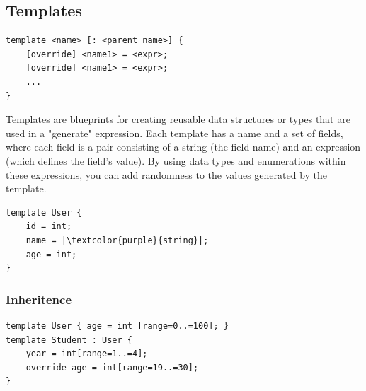 \documentclass[11pt,a4paper]{article}
\begin{document}
    \subsection{Templates}
    \begin{listing}[h]

    \begin{verbatim}
template <name> [: <parent_name>] {
    [override] <name1> = <expr>;
    [override] <name1> = <expr>;
    ...
}
    \end{verbatim}
    \centering
    \caption{Template declaration}
    \label{declaration:template}
    \end{listing}
    \par Templates are blueprints for creating reusable data structures or 
    types that are used in a "generate" expression. Each template has 
    a name and a set of fields, where each field is a pair consisting 
    of a string (the field name) and an expression (which defines the 
    field's value). By using data types and enumerations within these 
    expressions, you can add randomness to the values generated by the 
    template.
    \begin{listing}[h]
        \begin{verbatim}
template User {
    id = int;
    name = |\textcolor{purple}{string}|;
    age = int;
}
        \end{verbatim}
        \caption{Example template in testA}
        \centering
        \label{listing:1}
    \end{listing}
    \subsubsection{Inheritence}
    \begin{listing}[h]
        \begin{verbatim}
template User { age = int [range=0..=100]; }
template Student : User {
    year = int[range=1..=4];
    override age = int[range=19..=30];
}

        \end{verbatim}
        \caption{Inheritence example}
        \centering
        \label{listing:inheritance_example}
    \end{listing}
\end{document}
